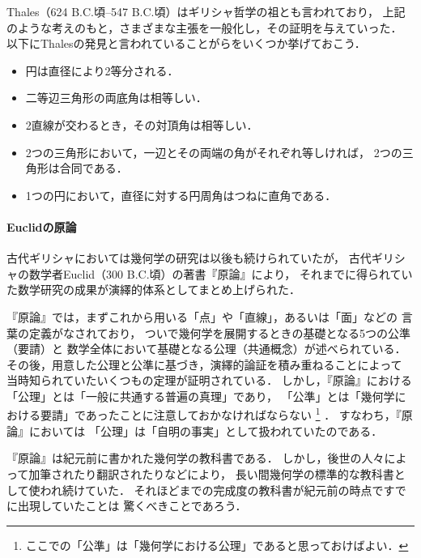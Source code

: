   Thales（624 B.C.頃--547 B.C.頃）はギリシャ哲学の祖とも言われており，
  上記のような考えのもと，さまざまな主張を一般化し，その証明を与えていった．
  以下にThalesの発見と言われていることがらをいくつか挙げておこう．
  \begin{itemize}
    \item 円は直径により2等分される．
    \item 二等辺三角形の両底角は相等しい．
    \item 2直線が交わるとき，その対頂角は相等しい．
    \item 2つの三角形において，一辺とその両端の角がそれぞれ等しければ，
      2つの三角形は合同である．
    \item 1つの円において，直径に対する円周角はつねに直角である．
  \end{itemize}

 \paragraph{Euclidの原論}
  古代ギリシャにおいては幾何学の研究は以後も続けられていたが，
  古代ギリシャの数学者Euclid（300 B.C.頃）の著書『原論』により，
  それまでに得られていた数学研究の成果が演繹的体系としてまとめ上げられた．

  『原論』では，まずこれから用いる「点」や「直線」，あるいは「面」などの
  言葉の定義がなされており，
  ついで幾何学を展開するときの基礎となる5つの公準（要請）と
  数学全体において基礎となる公理（共通概念）が述べられている．
  その後，用意した公理と公準に基づき，演繹的論証を積み重ねることによって
  当時知られていたいくつもの定理が証明されている．
  しかし，『原論』における「公理」とは「一般に共通する普遍の真理」であり，
  「公準」とは「幾何学における要請」であったことに注意しておかなければならない
  \footnote{ここでの「公準」は「幾何学における公理」であると思っておけばよい．}
  ．
  すなわち，『原論』においては
  「公理」は「自明の事実」として扱われていたのである．

  『原論』は紀元前に書かれた幾何学の教科書である．
  しかし，後世の人々によって加筆されたり翻訳されたりなどにより，
  長い間幾何学の標準的な教科書として使われ続けていた．
  それほどまでの完成度の教科書が紀元前の時点ですでに出現していたことは
  驚くべきことであろう．

